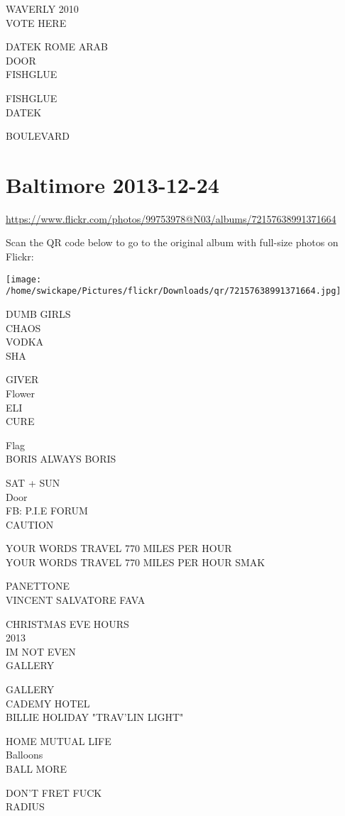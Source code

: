 \documentclass[10pt,letterpaper]{article}
\begin{document}
WAVERLY 2010\\
VOTE HERE

DATEK ROME ARAB\\
DOOR\\
FISHGLUE

FISHGLUE\\
DATEK

BOULEVARD
\pagebreak

\section*{Baltimore 2013-12-24}

\url{https://www.flickr.com/photos/99753978@N03/albums/72157638991371664}

Scan the QR code below to go to the original album with full-size photos on Flickr:

\texttt{[image: /home/swickape/Pictures/flickr/Downloads/qr/72157638991371664.jpg]}
\pagebreak

DUMB GIRLS\\
CHAOS\\
VODKA\\
SHA

GIVER\\
Flower\\
ELI\\
CURE

Flag\\
BORIS ALWAYS BORIS

SAT + SUN\\
Door\\
FB: P.I.E FORUM\\
CAUTION

YOUR WORDS TRAVEL 770 MILES PER HOUR\\
YOUR WORDS TRAVEL 770 MILES PER HOUR SMAK

PANETTONE\\
VINCENT SALVATORE FAVA

CHRISTMAS EVE HOURS\\
2013\\
IM NOT EVEN\\
GALLERY

GALLERY\\
CADEMY HOTEL\\
BILLIE HOLIDAY "TRAV'LIN LIGHT"

HOME MUTUAL LIFE\\
Balloons\\
BALL MORE

DON'T FRET FUCK\\
RADIUS
\end{document}
